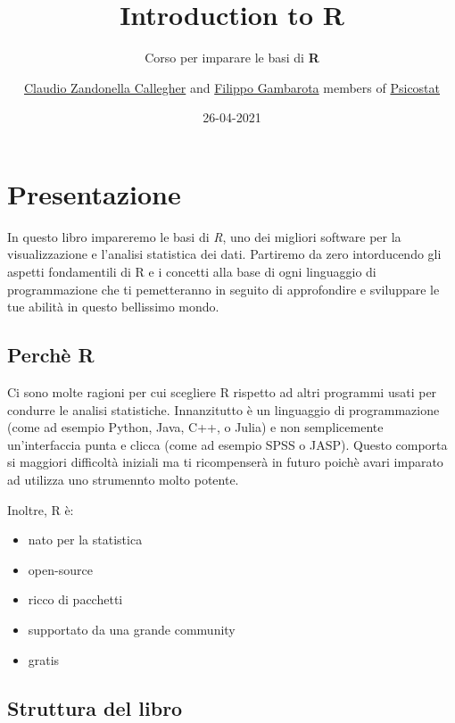 \documentclass[
]{book}
\title{{Introduction to R}}
\subtitle{Corso per imparare le basi di \textbf{R}}
\author{\href{https://claudiozandonella.netlify.app/}{Claudio Zandonella Callegher} and \href{https://filippogambarota.netlify.app/}{Filippo Gambarota} members of \href{https://psicostat.dpss.psy.unipd.it/}{Psicostat}}
\date{26-04-2021}
\providecommand{\tightlist}{%
  \setlength{\itemsep}{0pt}\setlength{\parskip}{0pt}}
\begin{document}
\maketitle

{
\setcounter{tocdepth}{1}
\tableofcontents
}
\hypertarget{presentazione}{%
\chapter*{Presentazione}\label{presentazione}}

In questo libro impareremo le basi di \emph{R}, uno dei migliori software per la visualizzazione e l'analisi statistica dei dati. Partiremo da zero intorducendo gli aspetti fondamentili di R e i concetti alla base di ogni linguaggio di programmazione che ti pemetteranno in seguito di approfondire e sviluppare le tue abilità in questo bellissimo mondo.

\hypertarget{perchuxe8-r}{%
\section*{Perchè R}\label{perchuxe8-r}}

Ci sono molte ragioni per cui scegliere R rispetto ad altri programmi usati per condurre le analisi statistiche. Innanzitutto è un linguaggio di programmazione (come ad esempio Python, Java, C++, o Julia) e non semplicemente un'interfaccia punta e clicca (come ad esempio SPSS o JASP). Questo comporta si maggiori difficoltà iniziali ma ti ricompenserà in futuro poichè avari imparato ad utilizza uno strumennto molto potente.

Inoltre, R è:

\begin{itemize}
\tightlist
\item
  nato per la statistica
\item
  open-source
\item
  ricco di pacchetti
\item
  supportato da una grande community
\item
  gratis
\end{itemize}

\hypertarget{struttura-del-libro}{%
\section*{Struttura del libro}\label{struttura-del-libro}}
\end{document}
